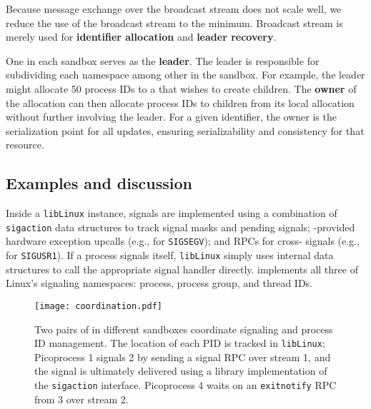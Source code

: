 Because message exchange over the broadcast stream does not scale well,
we reduce the use of the broadcast stream to the minimum.
Broadcast stream is merely used for {\bf \picoproc{} identifier allocation}
and {\bf leader recovery}.

One \picoproc{} in each sandbox serves as the {\bf leader}.
The leader is responsible for subdividing each namespace among other \picoprocs{} 
in the sandbox.
For example, the leader might allocate 50 process IDs to a \picoproc{}
that wishes to create children.  The {\bf owner} of the allocation can then allocate process IDs
to children from its local allocation without further involving the leader.
For a given identifier, the owner is the serialization point for all updates,
ensuring serializability and consistency for that resource.

\subsection{Examples and discussion}

 Inside a {\tt libLinux} instance, signals are implemented using a combination of 
{\tt sigaction} data structures %
to track signal masks and pending signals;
\pal{}-provided hardware exception upcalls (e.g., for {\tt SIGSEGV});
and  RPCs for cross-\picoproc{} signals (e.g., for  {\tt SIGUSR1}).
If a process signals itself, {\tt libLinux} simply uses internal data structures
to call the appropriate signal handler directly.
\graphene{} implements all three of Linux's signaling namespaces:
process, process group, and thread IDs.

\begin{figure}
\centering
\texttt{[image: coordination.pdf]}
\caption{Two pairs of \graphene{} \picoprocs{} in different sandboxes 
coordinate signaling and process ID management.
The location of each PID is tracked in {\tt libLinux}; Picoprocess 1 signals
\picoproc{} 2 by sending a signal RPC over stream 1,
and the signal is ultimately delivered using a 
library implementation of the {\tt sigaction} interface. Picoprocess 4 
waits on an {\tt exitnotify} RPC from  \picoproc{} 3 over stream 2. }
\label{fig:graphene:coordination}
\end{figure}

